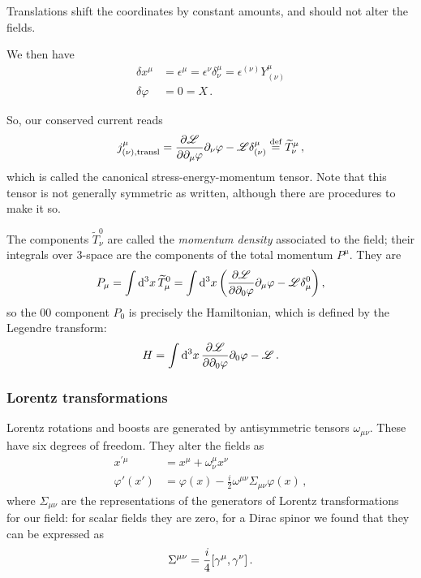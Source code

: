 \documentclass[main.tex]{subfiles}
\begin{document}
Translations shift the coordinates by constant amounts, and should not alter the fields. 

We then have 
%
\begin{align}
\delta x^{\mu } &= \epsilon^{\mu } = \epsilon^{\nu } \delta^{\mu }_{\nu } = \epsilon^{(\nu)} Y^{\mu }_{(\nu )}  \\
\delta \varphi &= 0 = X
\,.
\end{align}

So, our conserved current reads 
%
\begin{align}
j^{\mu } _{(\nu), \text{transl}} = \pdv{\mathscr{L}}{\partial_{\mu } \varphi } \partial_{\nu } \varphi  -  \mathscr{L} \delta^{\mu }_{(\nu )} \overset{\text{def}}{=} \widetilde{T}^{\mu }_{\nu }
\,,
\end{align}
%
which is called the canonical stress-energy-momentum tensor.
Note that this tensor is not generally symmetric as written, although there are procedures to make it so. 

The components \(\widetilde{T}^{0}_{\nu }\) are called the \emph{momentum density} associated to the field; their integrals over 3-space are the components of the total momentum \(P^{\mu }\). They are 
%
\begin{align}
P_{\mu } = \int \dd[3]{x} \widetilde{T}^{0}_{\mu } = \int \dd[3]{x} \qty(\pdv{\mathscr{L}}{\partial_{0} \varphi } \partial_{\mu } \varphi  - \mathscr{L} \delta^{0}_{\mu })
\,,
\end{align}
%
so the \(00\) component \(P_{0}\) is precisely the Hamiltonian, which is defined by the Legendre transform: 
%
\begin{align}
H = \int \dd[3]{x} \pdv{\mathscr{L}}{\partial_{0} \varphi } \partial_{0} \varphi - \mathscr{L}
\,.
\end{align}

\subsubsection{Lorentz transformations}

Lorentz rotations and boosts are generated by antisymmetric tensors \(\omega_{\mu \nu  }\). These have six degrees of freedom. They alter the fields as 
%
\begin{align}
x^{\prime \mu } &= x^{\mu } + \omega^{\mu }_{\nu }x^{\nu }  \\
\varphi '(x') &= \varphi (x) - \frac{i}{2} \omega^{\mu \nu } \Sigma_{\mu \nu } \varphi (x)
\,,
\end{align}
%
where \(\Sigma_{\mu \nu }\) are the representations of the generators of Lorentz transformations for our field: for scalar fields they are zero, for a Dirac spinor we found that they can be expressed as 
%
\begin{align}
\Sigma^{\mu \nu } = \frac{i}{4} \qty[\gamma^{\mu }, \gamma^{\nu }]
\,.
\end{align}
\end{document}
